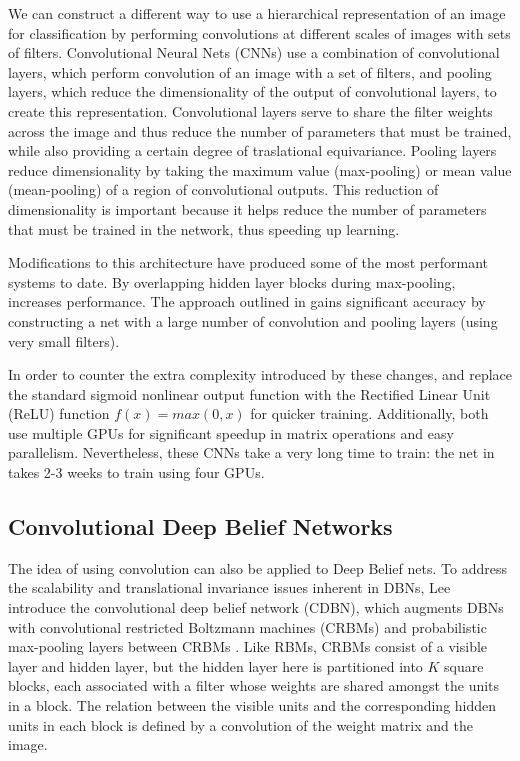 \documentclass[10pt,twocolumn,letterpaper]{article}
\begin{document}
We can construct a different way to use a hierarchical representation of an image for classification
by performing convolutions at different scales of images with sets of filters.
Convolutional Neural Nets (CNNs) use a combination of convolutional layers, which perform convolution
of an image with a set of filters, and pooling layers, which reduce the dimensionality of the output
of convolutional layers, to create this representation. Convolutional layers serve to share the filter weights
across the image and thus reduce the number of parameters that must be trained, while also providing
a certain degree of traslational equivariance.
Pooling layers reduce dimensionality by taking the maximum value (max-pooling) or mean value
(mean-pooling) of a region of convolutional outputs.
This reduction of dimensionality is important because it helps reduce the number of parameters that
must be trained in the network, thus speeding up learning.

Modifications to this architecture \cite{CDBN} have produced some of the most performant
systems to date.
By overlapping hidden layer blocks during max-pooling, \cite{ImageNet} increases performance.
The approach outlined in \cite{Verydeep} gains significant accuracy by constructing a net with
a large number of convolution and pooling layers (using very small filters).

In order to counter the extra complexity introduced by these changes,
\cite{ImageNet} and \cite{Verydeep} replace the standard sigmoid nonlinear output function with the
Rectified Linear Unit (ReLU) function $f(x) = max(0, x)$ for quicker training.
Additionally, both use multiple GPUs for significant speedup in matrix operations
and easy parallelism.
Nevertheless, these CNNs take a very long time to train: the net in \cite{Verydeep}
takes 2-3 weeks to train using four GPUs.

\subsection{Convolutional Deep Belief Networks}

The idea of using convolution can also be applied to Deep Belief nets.
To address the scalability and translational invariance issues inherent in DBNs,
Lee \etal introduce the convolutional deep belief network (CDBN),
which augments DBNs with convolutional restricted Boltzmann machines (CRBMs)
and probabilistic max-pooling layers between CRBMs \cite{CDBN}.
Like RBMs, CRBMs consist of a visible layer and hidden layer, but the hidden
layer here is partitioned into $K$ square blocks, each associated with a filter
whose weights are shared amongst the units in a block.
The relation between the visible units and the corresponding hidden units in each
block is defined by a convolution of the weight matrix and the image.
\end{document}
